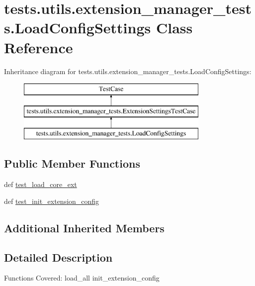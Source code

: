 \hypertarget{classtests_1_1utils_1_1extension__manager__tests_1_1LoadConfigSettings}{\section{tests.\+utils.\+extension\+\_\+manager\+\_\+tests.\+Load\+Config\+Settings Class Reference}
\label{classtests_1_1utils_1_1extension__manager__tests_1_1LoadConfigSettings}
}
Inheritance diagram for tests.\+utils.\+extension\+\_\+manager\+\_\+tests.\+Load\+Config\+Settings\+:\begin{figure}[H]
\begin{center}
\leavevmode
\includegraphics[height=3.000000cm]{classtests_1_1utils_1_1extension__manager__tests_1_1LoadConfigSettings}
\end{center}
\end{figure}
\subsection*{Public Member Functions}
\begin{DoxyCompactItemize}
\item 
def \hyperlink{classtests_1_1utils_1_1extension__manager__tests_1_1LoadConfigSettings_a6a030c80c178c3d3f0ca0ad4603121c1}{test\+\_\+load\+\_\+core\+\_\+ext}
\item 
def \hyperlink{classtests_1_1utils_1_1extension__manager__tests_1_1LoadConfigSettings_ad545de88fc2f5eba813161fa4cb31d83}{test\+\_\+init\+\_\+extension\+\_\+config}
\end{DoxyCompactItemize}
\subsection*{Additional Inherited Members}


\subsection{Detailed Description}
\begin{DoxyVerb}Functions Covered:
  load_all
  init_extension_config\end{DoxyVerb}
 

